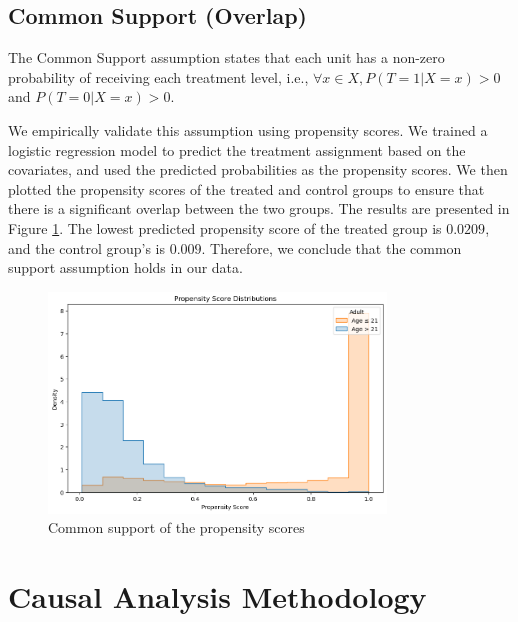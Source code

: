 \documentclass[11pt]{article}
\newcommand{\gur}[1]{{\color{teal}{Gur: #1}}}
\begin{document}
\gur{'We close with a reminder to readers of the optimistic view of the complexity of data and how correlation between observed variables and unmeasured ones can reduce any bias associated with unmeasured information.' https://www.ncbi.nlm.nih.gov/pmc/articles/PMC10666970/}

\subsection{Common Support (Overlap)}

The Common Support assumption states that each unit has a non-zero probability of receiving each treatment level, i.e., $\forall x \in X, P(T=1|X=x) > 0$ and $P(T=0|X=x) > 0$.

We empirically validate this assumption using propensity scores. We trained a logistic regression model to predict the treatment assignment based on the covariates, and used the predicted probabilities as the propensity scores. We then plotted the propensity scores of the treated and control groups to ensure that there is a significant overlap between the two groups. The results are presented in Figure \ref{fig:common_support}. The lowest predicted propensity score of the treated group is $0.0209$, and the control group's is $0.009$. Therefore, we conclude that the common support assumption holds in our data.

\begin{figure}
    \centering
    \caption{Common support of the propensity scores}
    \label{fig:common_support}
    \includegraphics[width = 0.8\textwidth]{images/common support propensity graph.png}
\end{figure}



\section{Causal Analysis Methodology}
\end{document}

